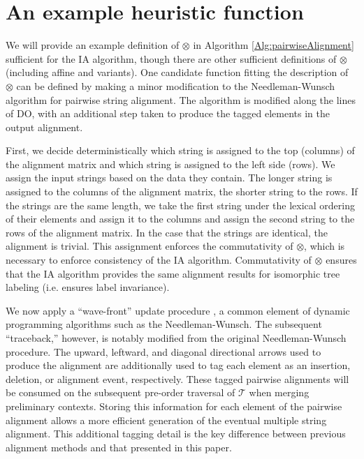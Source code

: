 \documentclass{bmcart}
\begin{document}
\section*{An example heuristic function}

We will provide an example definition of $\otimes$ in Algorithm \ref{Alg:pairwiseAlignment} sufficient for the IA algorithm, though there are other sufficient definitions of $\otimes$ (including affine and \cite{Ukkonen1985} variants).
One candidate function fitting the description of $\otimes$ can be defined by making a minor modification to the Needleman-Wunsch \citep{Needleman1970} algorithm for pairwise string alignment.
The algorithm is modified along the lines of DO, with an additional step taken to produce the tagged elements in the output alignment.

First, we decide deterministically which string is assigned to the top (columns) of the alignment matrix and which string is assigned to the left side (rows).
We assign the input strings based on the data they contain.
The longer string is assigned to the columns of the alignment matrix, the shorter string to the rows.
If the strings are the same length, we take the first string under the lexical ordering of their elements and assign it to the columns and assign the second string to the rows of the alignment matrix. 
In the case that the strings are identical, the alignment is trivial.
This assignment enforces the commutativity of $\otimes$, which is necessary to enforce consistency of the IA algorithm.
Commutativity of $\otimes$ ensures that the IA algorithm provides the same alignment results for isomorphic tree labeling (i.e. ensures label invariance).

We now apply a ``wave-front'' update procedure \citep{cormen2001}, a common element of dynamic programming algorithms such as the Needleman-Wunsch.
The subsequent ``traceback,'' however, is notably modified from the original Needleman-Wunsch procedure.
The upward, leftward, and diagonal directional arrows used to produce the alignment are additionally used to tag each element as an insertion, deletion, or alignment event, respectively. 
These tagged pairwise alignments will be consumed on the subsequent pre-order traversal of $\mathcal{T}$ when merging preliminary contexts.
Storing this information for each element of the pairwise alignment allows a more efficient generation of the eventual multiple string alignment.
This additional tagging detail is the key difference between previous alignment methods and that presented in this paper.
\end{document}
